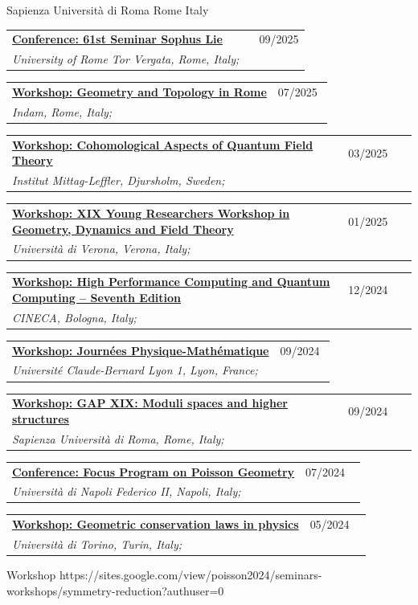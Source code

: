 \documentclass[a4paper]{article}
\newcommand{\longvoice}[8]{
    \begin{tabular}{p{0.83\linewidth} p{0.17\linewidth} }
        \textbf{\href{#3}{#2: #1}} & #4 
        \\ 
        \textit{#5, #6, #7;} & {\small\emph{#8}}
    \end{tabular}
    \vspace{.5em}
}
\begin{document}
        {Sapienza Università di Roma}
        {Rome}
        {Italy}
        {}
    \longvoice{61st Seminar Sophus Lie}
        {Conference}
        {https://sites.google.com/view/slw61/home-page?authuser=0}
        {09/2025}
        {University of Rome Tor Vergata}
        {Rome}
        {Italy}
        {}
    \longvoice{Geometry and Topology in Rome}
        {Workshop}
        {https://www.mat.uniroma2.it/~kowalzig/ws.html}
        {07/2025}
        {Indam}
        {Rome}
        {Italy}
        {}
    \longvoice{Cohomological Aspects of Quantum Field Theory}
        {Workshop}
        {https://www.mittag-leffler.se/activities/cohomological-aspects-of-quantum-field-theory/}
        {03/2025}
        {Institut Mittag-Leffler}
        {Djursholm}
        {Sweden}
        {}
    \longvoice{XIX Young Researchers Workshop in Geometry, Dynamics and Field Theory}
        {Workshop}
        {https://sites.google.com/view/xix-yrw-verona/program?authuser=0}
        {01/2025}
        {Università di Verona}
        {Verona}
        {Italy}
        {}
    \longvoice{High Performance Computing and Quantum Computing – Seventh Edition}
        {Workshop}
        {https://eventi.cineca.it/en/hpc/high-performance-computing-and-quantum-computing-seventh-edition/bologna-20241212}
        {12/2024}
        {CINECA}
        {Bologna}
        {Italy}
        {}
    \longvoice{Journées Physique-Mathématique}
        {Workshop}
        {https://indico.math.cnrs.fr/event/12743/overview}
        {09/2024}
        {Université Claude-Bernard Lyon 1}
        {Lyon}
        {France}
        {}
    \longvoice{GAP XIX: Moduli spaces and higher structures}
        {Workshop}
        {https://www1.mat.uniroma1.it/~fiorenza/GAP-Rome/GAP-XIX-2024-Rome.html}
        {09/2024}
        {Sapienza Università di Roma}
        {Rome}
        {Italy}
        {}
    \longvoice{Focus Program on Poisson Geometry}
        {Conference}
        {https://sites.google.com/view/poisson2024/poisson-2024?authuser=0}
        {07/2024}
        {Università di Napoli Federico II}
        {Napoli}
        {Italy}
        {}
    \longvoice{Geometric conservation laws in physics}
        {Workshop}
        {https://www.dropbox.com/scl/fi/j54tl4m10fl2scbrtc4sx/2405-Torino-Conservationlaws.pdf?rlkey=ay7nrxda4fg8lklvox578g6yj\&st=9t3jx47r\&dl=0}
        {05/2024}
        {Università di Torino}
        {Turin}
        {Italy}
        {}
        {Workshop}
        {https://sites.google.com/view/poisson2024/seminars-workshops/symmetry-reduction?authuser=0}
\end{document}
